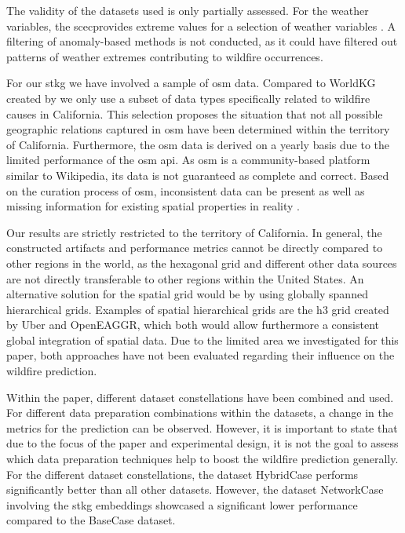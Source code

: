 \documentclass[
]{ceurart}
\begin{document}
The validity of the datasets used is only partially assessed. For the weather variables, the \gls*{scec}provides extreme values for a selection of weather variables \cite{StateClimateExtremesCommittee.2022}. A filtering of anomaly-based methods is not conducted, as it could have filtered out patterns of weather extremes contributing to wildfire occurrences.

For our \gls*{stkg} we have involved a sample of \gls*{osm} data. Compared to WorldKG created by \cite{Tempelmeier.2021} we only use a subset of data types specifically related to wildfire causes in California. This selection proposes the situation that not all possible geographic relations captured in \gls*{osm} have been determined within the territory of California. Furthermore, the \gls*{osm} data is derived on a yearly basis due to the limited performance of the \gls*{osm} \gls*{api}. As \gls*{osm} is a community-based platform similar to Wikipedia, its data is not guaranteed as complete and correct. Based on the curation process of \gls*{osm}, inconsistent data can be present as well as missing information for existing spatial properties in reality \cite{Basiri.2016}.

Our results are strictly restricted to the territory of California. In general, the constructed artifacts and performance metrics cannot be directly compared to other regions in the world, as the hexagonal grid and different other data sources are not directly transferable to other regions within the United States. An alternative solution for the spatial grid would be by using globally spanned hierarchical grids. Examples of spatial hierarchical grids are the h3 grid created by Uber and OpenEAGGR, which both would allow furthermore a consistent global integration of spatial data. Due to the limited area we investigated for this paper, both approaches have not been evaluated regarding their influence on the wildfire prediction.

Within the paper, different dataset constellations have been combined and used. For different data preparation combinations within the datasets, a change in the metrics for the prediction can be observed. However, it is important to state that due to the focus of the paper and experimental design, it is not the goal to assess which data preparation techniques help to boost the wildfire prediction generally. For the different dataset constellations, the dataset HybridCase performs significantly better than all other datasets. However, the dataset NetworkCase involving the \gls*{stkg} embeddings showcased a significant lower performance compared to the BaseCase dataset.
\end{document}
